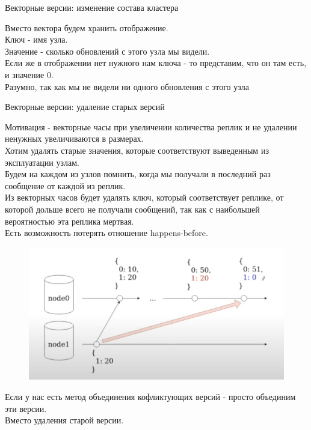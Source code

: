 \begin{definition}
  Векторные версии: изменение состава кластера
\end{definition}
Вместо вектора будем хранить отображение.\\
Ключ - имя узла.\\
Значение - сколько обновлений с этого узла мы видели.\\
Если же в отображении нет нужного нам ключа - то представим, что он там есть, и значение $0$.\\
Разумно, так как мы не видели ни одного обновления с этого узла
\begin{definition}
  Векторные версии: удаление старых версий
\end{definition}
Мотивация - векторные часы при увеличении количества реплик и не удалении ненужных увеличиваются в размерах.\\
Хотим удалять старые значения, которые соответствуют выведенным из эксплуатации узлам.\\
Будем на каждом из узлов помнить, когда мы получали в последний раз сообщение от каждой из реплик.\\
Из векторных часов будет удалять ключ, который соответствует реплике, от которой дольше всего не получали сообщений, так как с наибольшей вероятностью эта реплика мертвая.\\
Есть возможность потерять отношение happens-before.\\
\begin{figure}[h]
    \centering
    \includegraphics[scale = 0.5]{../assets/9.png}
    \caption{}
\end{figure}
Если у нас есть метод объединения кофликтующих версий - просто объединим эти версии.\\
Вместо удаления старой версии.
